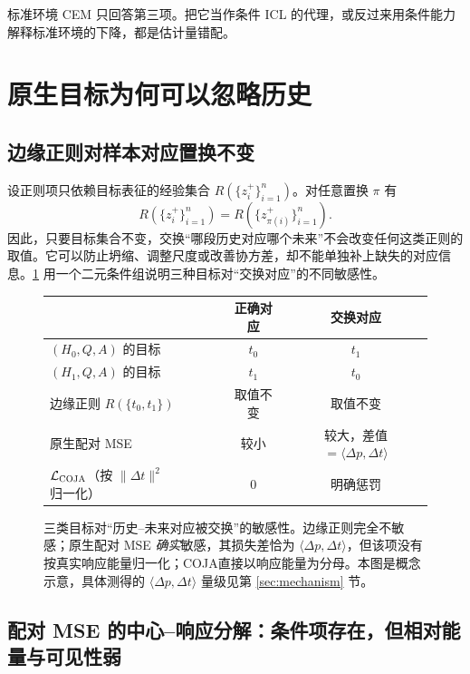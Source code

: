 \documentclass[UTF8,zihao=-4,fontset=fandol]{ctexart}
\newcommand{\method}{\textsc{COJA}}
\begin{document}
标准环境 CEM 只回答第三项。把它当作条件 ICL 的代理，或反过来用条件能力解释标准环境的下降，都是估计量错配。

\section{原生目标为何可以忽略历史}
\label{sec:why}

\subsection{边缘正则对样本对应置换不变}

设正则项只依赖目标表征的经验集合 $R(\{z_i^+\}_{i=1}^n)$。对任意置换 $\pi$ 有
\begin{equation}
  R(\{z_i^+\}_{i=1}^n)=R(\{z_{\pi(i)}^+\}_{i=1}^n).
\end{equation}
因此，只要目标集合不变，交换“哪段历史对应哪个未来”不会改变任何这类正则的取值。它可以防止坍缩、调整尺度或改善协方差，却不能单独补上缺失的对应信息。\cref{fig:permutation} 用一个二元条件组说明三种目标对“交换对应”的不同敏感性。

\begin{figure}[t]
\centering
\small
\setlength{\tabcolsep}{6pt}
\begin{tabular}{@{}lcc@{}}
\toprule
& 正确对应 & 交换对应 \\
\midrule
$(H_0,Q,A)$ 的目标 & $t_0$ & $t_1$ \\
$(H_1,Q,A)$ 的目标 & $t_1$ & $t_0$ \\
\midrule
边缘正则 $R(\{t_0,t_1\})$ & 取值不变 & 取值不变 \\
原生配对 MSE & 较小 & 较大，差值 $=\langle\Delta p,\Delta t\rangle$ \\
$\mathcal{L}_{\method}$（按 $\lVert\Delta t\rVert^2$ 归一化） & $0$ & 明确惩罚 \\
\bottomrule
\end{tabular}
\caption{三类目标对“历史--未来对应被交换”的敏感性。边缘正则完全不敏感；原生配对 MSE \emph{确实}敏感，其损失差恰为 $\langle\Delta p,\Delta t\rangle$，但该项没有按真实响应能量归一化；\method 直接以响应能量为分母。本图是概念示意，具体测得的 $\langle\Delta p,\Delta t\rangle$ 量级见第 \ref{sec:mechanism} 节。}
\label{fig:permutation}
\end{figure}

\subsection{配对 MSE 的中心--响应分解：条件项存在，但相对能量与可见性弱}
\label{sec:decomposition}
\end{document}
